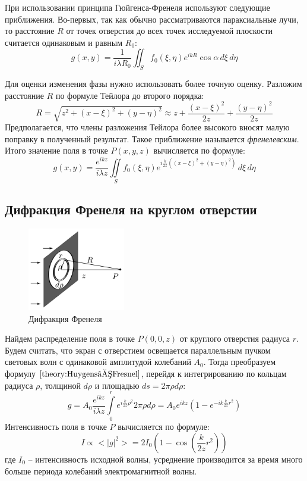 При использовании принципа Гюйгенса-Френеля используют следующие приближения. Во-первых, так как обычно рассматриваются параксиальные лучи, то расстояние $R$ от точек отверстия до всех точек исследуемой плоскости считается одинаковым и равным $R_0$:
$$
g(x, y) = \frac{1}{i \lambda R_0} \iint_S f_0(\xi, \eta) e^{ikR} \cos \alpha  \, d\xi \, d\eta
$$

Для оценки изменения фазы нужно использовать более точную оценку. Разложим расстояние $R$ по формуле Тейлора до второго порядка:
$$
R = \sqrt{z^2 + (x - \xi)^2 + (y - \eta)^2} \approx z + \frac{(x - \xi)^2}{2 z} + \frac{(y - \eta)^2}{2z}
$$
Предполагается, что члены разложения Тейлора более высокого вносят малую поправку в полученный результат. Такое приближение называется \textit{френелевским}. Итого значение поля в точке $P(x, y, z)$ вычисляется по формуле:
\begin{equation*}
	g(x, y) = \frac{e^{ikz}}{i \lambda z} \iint\limits_S f_0(\xi, \eta) e^{i\frac{k}{2z}\left((x-\xi)^2 + (y - \eta)^2\right)} \, d\xi \, d\eta
	\label{theory:Huygens–Fresnel-approx}
\end{equation*}

\subsection*{Дифракция Френеля на круглом отверстии}

\begin{figure}
	\centering
	\includegraphics[width=0.38\textwidth]{../Изображения/Дифракция Френеля.png}
	\caption{Дифракция Френеля}
\end{figure}

Найдем распределение поля в точке $P(0, 0, z)$ от круглого отверстия радиуса $r$. Будем считать, что экран с отверстием освещается параллельным пучком световых волн с одинаковой амплитудой колебаний $A_0$. Тогда преобразуем формулу $\ref{theory:Huygens–Fresnel}$, перейдя к интегрированию по кольцам радиуса $\rho$, толщиной $d\rho$ и площадью $ds = 2 \pi \rho d \rho$:
$$
	g = A_0 \frac{e^{ikz}}{i \lambda z} \int \limits_0^r e^{i\frac{k}{2z} \rho^2} 2\pi \rho d \rho = A_0 e^{ikz} \left( 1 - e^{-ik\frac{k}{2z}r^2} \right)
$$
Интенсивность поля в точке $P$ вычисляется по формуле:
\begin{equation*}
	I \propto <|g|^2> = 2I_0 \left(1 - \cos \left( \frac{k}{2z}r^2 \right)\right)
	\label{eq:Fresnels-intensity}
\end{equation*}
где $I_0$ -- интенсивность исходной волны, усреднение производится за время много больше периода колебаний электромагнитной волны.

